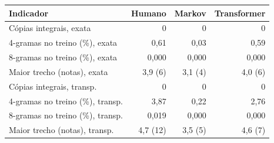 \begin{tabular}{lrrr}
\toprule
Indicador & Humano & Markov & Transformer \\
\midrule
Cópias integrais, exata & 0 & 0 & 0 \\
4-gramas no treino (\%), exata & 0,61 & 0,03 & 0,59 \\
8-gramas no treino (\%), exata & 0,000 & 0,000 & 0,000 \\
Maior trecho (notas), exata & 3,9 (6) & 3,1 (4) & 4,0 (6) \\
\midrule
Cópias integrais, transp. & 0 & 0 & 0 \\
4-gramas no treino (\%), transp. & 3,87 & 0,22 & 2,76 \\
8-gramas no treino (\%), transp. & 0,019 & 0,000 & 0,000 \\
Maior trecho (notas), transp. & 4,7 (12) & 3,5 (5) & 4,6 (7) \\
\bottomrule
\end{tabular}
